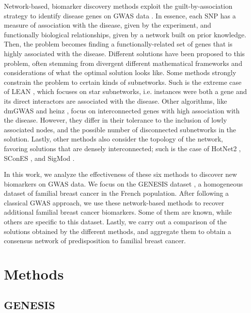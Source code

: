 \documentclass[twocolumn, 10pt]{article}
\begin{document}
Network-based, biomarker discovery methods exploit the guilt-by-association strategy to identify disease genes on GWAS data \cite{azencott_network-guided_2016}. In essence, each SNP has a measure of association with the disease, given by the experiment, and functionally biological relationships, given by a network built on prior knowledge. Then, the problem becomes finding a functionally-related set of genes that is highly associated with the disease. Different solutions have been proposed to this problem, often stemming from divergent different mathematical frameworks and considerations of what the optimal solution looks like. Some methods strongly constrain the problem to certain kinds of subnetworks. Such is the extreme case of LEAN \cite{gwinner_network-based_2016}, which focuses on star subnetworks, i.e. instances were both a gene and its direct interactors are associated with the disease. Other algorithms, like dmGWAS \cite{jia_dmgwas:_2011} and heinz \cite{dittrich_identifying_2008}, focus on interconnected genes with high association with the disease. However, they differ in their tolerance to the inclusion of lowly associated nodes, and the possible number of disconnected subnetworks in the solution. Lastly, other methods also consider the topology of the network, favoring solutions that are densely interconnected; such is the case of HotNet2 \cite{leiserson_pan-cancer_2015}, SConES \cite{azencott_efficient_2013}, and SigMod \cite{liu_sigmod:_2017}.

In this work, we analyze the effectiveness of these six methods to discover new biomarkers on GWAS data. We focus on the GENESIS dataset \cite{sinilnikova_genesis:_2016}, a homogeneous dataset of familial breast cancer in the French population. After following a classical GWAS approach, we use these network-based methods to recover additional familial breast cancer biomarkers. Some of them are known, while others are specific to this dataset. Lastly, we carry out a comparison of the solutions obtained by the different methods, and aggregate them to obtain a consensus network of predisposition to familial breast cancer. 

\section{Methods}
\label{sec:org9e7ca64}
\subsection{GENESIS}
\label{sec:org920eb00}
\end{document}
